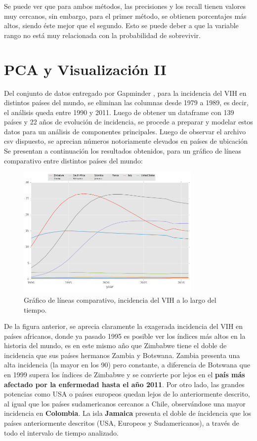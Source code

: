 \documentclass[letter, 10pt]{article}
\begin{document}
Se puede ver que para ambos métodos, las precisiones y los recall tienen valores muy cercanos, sin embargo, para el primer método, se obtienen porcentajes más altos, siendo éste mejor que el segundo. Esto se puede deber a que la variable rango no está muy relacionada con la probabilidad de sobrevivir.

\section{PCA y Visualización II}

Del conjunto de datos entregado por Gapminder \cite{G1} , para la incidencia del VIH en distintos países del mundo, se eliminan las columnas desde 1979 a 1989, es decir, el análisis queda entre 1990 y 2011. Luego de obtener un dataframe con 139 países y 22 años de evolución de incidencia, se procede a preparar y modelar estos datos para un análisis de componentes principales. Luego de observar el archivo csv dispuesto, se aprecian números notoriamente elevados en países de ubicación  Se presentan a continuación los resultados obtenidos, para un gráfico de líneas comparativo entre distintos países del mundo:

\begin{figure}[H]
\begin{center}
\includegraphics[width=0.8\textwidth]{Images/1line.png}
\caption{Gráfico de líneas comparativo, incidencia del VIH a lo largo del tiempo.}
\end{center}
\end{figure}

De la figura anterior, se aprecia claramente la exagerada incidencia del VIH en países africanos, donde ya pasado 1995 es posible ver los índices más altos en la historia del mundo, es en este mismo año que Zimbabwe tiene el doble de incidencia que sus países hermanos Zambia y Botswana. Zambia presenta una alta incidencia (la mayor en los 90) pero constante, a diferencia de Botswana que en 1999 supera los índices de Zimbabwe y se convierte por lejos en el \textbf{país más afectado por la enfermedad hasta el año 2011}. Por otro lado, las grandes potencias como USA o países europeos quedan lejos de lo anteriormente descrito, al igual que los países sudamericanos cercanos a Chile, observándose una mayor incidencia en \textbf{Colombia}. La isla \textbf{Jamaica}  presenta el doble de íncidencia que los países anteriormente descritos (USA, Europeos y Sudamericanos), a través de todo el intervalo de tiempo analizado.\\
\end{document}
